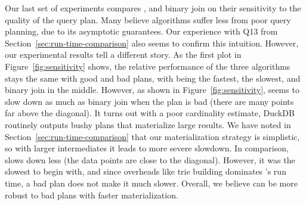 Our last set of experiments compares \FJ, \GJ and binary join
on their sensitivity to the quality of the query plan.
Many believe \WCOJ algorithms suffer less from poor query planning,
due to its asymptotic guarantees.
Our experience with Q13 from Section~\ref{sec:run-time-comparison}
also seems to confirm this intuition.
However, our experimental results tell a different story.
As the first plot in Figure~\ref{fig:sensitivity} shows,
the relative performance of the three algorithms stays
the same with good and bad plans, with \FJ being the fastest,
\GJ the slowest, and binary join in the middle.
However, as shown in Figure~\ref{fig:sensitivity},
\FJ seems to slow down as much as binary join
when the plan is bad (there are many points far above the diagonal).
It turns out with a poor cardinality estimate,
DuckDB routinely outputs bushy plans that materialize large results.
We have noted in Section~\ref{sec:run-time-comparison} that
our materialization strategy is simplistic,
so with larger intermediates it leads to more severe slowdown.
In comparison, \GJ slows down less (the data points are close to the diagonal).
However, it was the slowest to begin with,
and since overheads like trie building dominates \GJ's run time,
a bad plan does not make it much slower.
Overall, we believe \FJ can be more robust to bad plans with
faster materialization.
